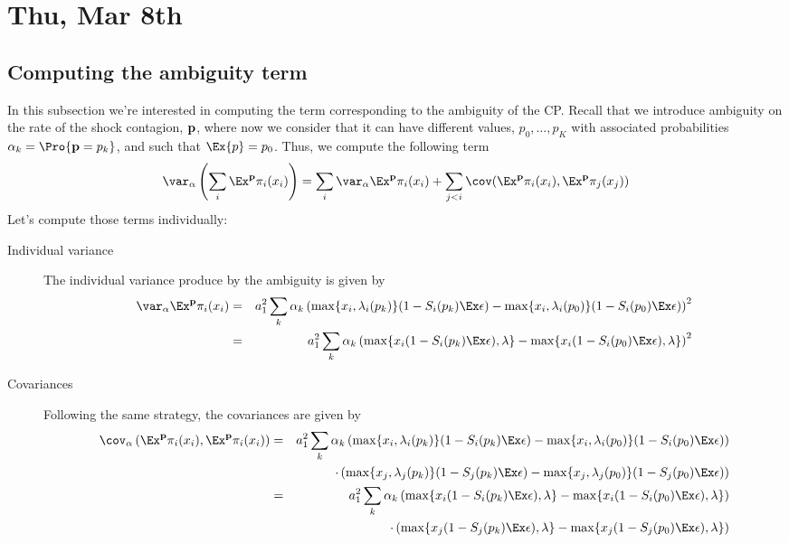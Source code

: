 \section{Thu, Mar 8th}
\subsection{Computing the ambiguity term}
In this subsection we're interested in computing the term corresponding to the ambiguity of the CP.  Recall that we introduce ambiguity on the rate of the shock contagion, ${\bf p}$, where now we consider that it can have different values, $p_0,\ldots,p_K$ with associated probabilities $\alpha_k=\Pro\{{\bf p}=p_k\}$, and such that $\Ex\{p\}=p_0$.  Thus, we compute the following term
\[\var_\alpha\left(\sum_i \Ex^{\bf p}\pi_i(x_i)\right)=\sum_i\var_\alpha\Ex^{\bf p}\pi_i(x_i)+\sum_{j<i}\cov(\Ex^{\bf p}\pi_i(x_i),\Ex^{\bf p}\pi_j(x_j))\]
Let's compute those terms individually:
\begin{description}
\item[Individual variance] The individual variance produce by the ambiguity is given by
\begin{eqnarray*}
\var_\alpha\Ex^{\bf p}\pi_i(x_i)&=&a_1^2\sum_{k}\alpha_k \left(\max\{x_i,\lambda_i(p_k)\}(1-S_i(p_k)\Ex\epsilon) - \max\{x_i,\lambda_i(p_0)\}(1-S_i(p_0)\Ex\epsilon) \right)^2\\
&=&a_1^2\sum_{k}\alpha_k \left(\max\{x_i(1-S_i(p_k)\Ex\epsilon),\lambda\} - \max\{x_i(1-S_i(p_0)\Ex\epsilon),\lambda\} \right)^2
\end{eqnarray*}
\item[Covariances] Following the same strategy, the covariances are given by
\begin{eqnarray*}
\cov_\alpha\left(\Ex^{\bf p}\pi_i(x_i),\Ex^{\bf p}\pi_i(x_i)\right)&=&a_1^2\sum_{k}\alpha_k \left(\max\{x_i,\lambda_i(p_k)\}(1-S_i(p_k)\Ex\epsilon) - \max\{x_i,\lambda_i(p_0)\}(1-S_i(p_0)\Ex\epsilon) \right)\\
&&\quad\quad\cdot\left(\max\{x_j,\lambda_j(p_k)\}(1-S_j(p_k)\Ex\epsilon) - \max\{x_j,\lambda_j(p_0)\}(1-S_j(p_0)\Ex\epsilon) \right)\\
&=&a_1^2\sum_{k}\alpha_k \left(\max\{x_i(1-S_i(p_k)\Ex\epsilon),\lambda\} - \max\{x_i(1-S_i(p_0)\Ex\epsilon),\lambda\} \right)\\
&&\quad\quad\cdot\left(\max\{x_j(1-S_j(p_k)\Ex\epsilon),\lambda\} - \max\{x_j(1-S_j(p_0)\Ex\epsilon),\lambda\} \right)
\end{eqnarray*} 
\end{description}